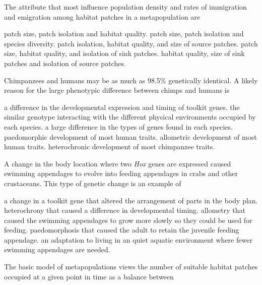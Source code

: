 \question
The attribute that most influence population density and rates of immigration and emigration among habitat patches in a metapopulation are

\begin{choices}
\correctchoice patch size, patch isolation and habitat quality. %
\choice patch size, patch isolation and species diversity. %
\choice patch isolation, habitat quality, and size of source patches. %
\choice patch size, habitat quality, and isolation of sink patches. %
\choice habitat quality, size of sink patches and isolation of source patches. %
\end{choices}

	
\question
Chimpanzees and humans may be as much as 98.5\% genetically identical.  A likely reason for the large phenotypic difference between chimps and humans is

\begin{choices}
\correctchoice a difference in the developmental expression and timing of toolkit genes. %
\choice the similar genotype interacting with the different physical environments occupied by each species. %
\choice a large difference in the types of genes found in each species. %
\choice paedomorphic development of most human traits. %
\choice allometric development of most human traits. %
\choice heterochronic development of most chimpanzee traits. %
\end{choices}

\question
A change in the body location where two \textit{Hox} genes are expressed caused swimming appendages to evolve into feeding appendages in crabs and other crustaceans. This type of genetic change is an example of

\begin{choices}
\correctchoice a change in a toolkit gene that altered the arrangement of parts in the body plan. %
\choice heterochrony that caused a difference in developmental timing. %
\choice allometry that caused the swimming appendages to grow more slowly so they could be used for feeding. %
\choice paedomorphosis that caused the adult to retain the juvenile feeding appendage. %
\choice an adaptation to living in an quiet aquatic environment where fewer swimming appendages are needed. %
\end{choices}


\question
The basic model of metapopulations views the number of suitable habitat patches occupied at a given point in time as a balance between


